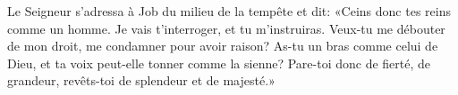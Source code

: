 Le Seigneur s’adressa à Job du milieu de la tempête et dit:
	«Ceins donc tes reins comme un homme.
	Je vais t’interroger, et tu m’instruiras.
Veux-tu me débouter de mon droit, me condamner pour avoir raison?
As-tu un bras comme celui de Dieu, et ta voix peut-elle tonner comme la sienne?
Pare-toi donc de fierté, de grandeur, revêts-toi de splendeur et de majesté.»
